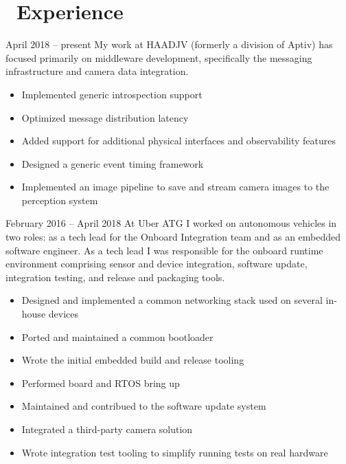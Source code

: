 \documentclass{resume}
\begin{document}


 
\section{\faWrench\ Experience}
          {April 2018 -- present}
My work at HAADJV (formerly a division of Aptiv) has focused primarily on middleware development,
specifically the messaging infrastructure and camera data integration.
\begin{itemize}
  \item Implemented generic introspection support
  \item Optimized message distribution latency
  \item Added support for additional physical interfaces and observability features
  \item Designed a generic event timing framework
  \item Implemented an image pipeline to save and stream camera images to the perception system
\end{itemize}
\vspace{3mm}

          {February 2016 -- April 2018}
At Uber ATG I worked on autonomous vehicles in two roles: as a tech lead for the Onboard Integration team and
as an embedded software engineer.  As a tech lead I was responsible for the onboard runtime
environment comprising sensor and device integration, software update, integration testing, and
release and packaging tools.
\begin{itemize}
  \item Designed and implemented a common networking stack used on several in-house devices
  \item Ported and maintained a common bootloader
  \item Wrote the initial embedded build and release tooling
  \item Performed board and RTOS bring up
  \item Maintained and contribued to the software update system
  \item Integrated a third-party camera solution
  \item Wrote integration test tooling to simplify running tests on real hardware
\end{itemize}
\vspace{3mm}
\end{document}
